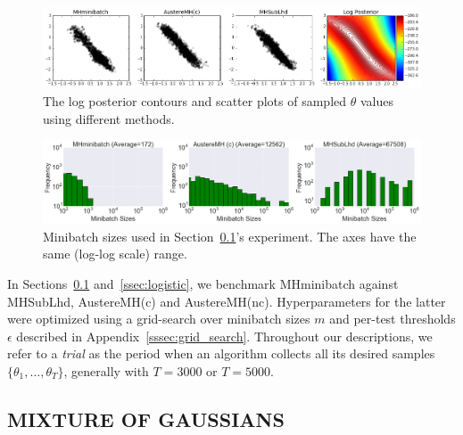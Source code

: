\documentclass[letterpaper]{article}
\begin{document}
\begin{figure}[t]
    \centering
    \includegraphics[width=1.0\linewidth]{gaussian_mixture_scatter_results_v8.png}
    \caption{
    The log posterior contours and scatter plots of sampled $\theta$ values
    using different methods. 
    }
    \label{fig:gauss_mix_1}
\end{figure}
\begin{figure}[t]
    \centering
    \includegraphics[width=0.9\linewidth]{gaussian_mixture_histogram_results_v8.png}
    \caption{
    Minibatch sizes used in Section~\ref{ssec:gaussians}'s experiment. The axes
    have the same (log-log scale) range.
    }
    \label{fig:gauss_mix_2}
\end{figure}


In Sections~\ref{ssec:gaussians} and~\ref{ssec:logistic}, we benchmark {\sc
MHminibatch} against {\sc MHSubLhd}, {\sc AustereMH(c)} and {\sc AustereMH(nc)}.
Hyperparameters for the latter were optimized using a grid-search over minibatch
sizes $m$ and per-test thresholds $\epsilon$ described in
Appendix~\ref{sssec:grid_search}. Throughout our descriptions, we refer to a
\emph{trial} as the period when an algorithm collects all its desired samples
$\{\theta_1,\ldots,\theta_T\}$, generally with $T=3000$ or $T=5000$.

\subsection{MIXTURE OF GAUSSIANS}\label{ssec:gaussians}
\end{document}
